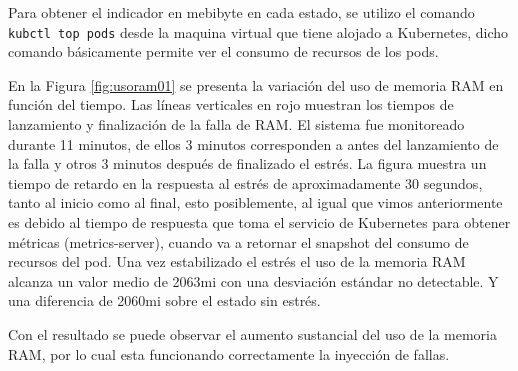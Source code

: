 \par Para obtener el indicador en mebibyte en cada estado, se utilizo el comando \\ \verb|kubctl top pods| desde la maquina virtual que tiene alojado a Kubernetes, dicho comando básicamente permite ver el consumo de recursos de los pods.\\

\par En la Figura \ref{fig:usoram01} se presenta la variación del uso de memoria RAM en función del tiempo. Las líneas verticales en rojo muestran los tiempos de lanzamiento y finalización de la falla de RAM. El sistema fue monitoreado durante 11 minutos, de ellos 3 minutos corresponden a antes del lanzamiento de la falla y otros 3 minutos después de finalizado el estrés. La figura muestra un tiempo de retardo en la respuesta al estrés de aproximadamente 30 segundos, tanto al inicio como al final, esto posiblemente, al igual que vimos anteriormente es debido al tiempo de respuesta que toma el servicio de Kubernetes para obtener métricas (metrics-server), cuando va a retornar el snapshot del consumo de recursos del pod. Una vez estabilizado el estrés el uso de la memoria RAM alcanza un valor medio de 2063mi con una desviación estándar no detectable. Y una diferencia de 2060mi sobre el estado sin estrés.\\


\vspace{\baselineskip}
\par Con el resultado se puede observar el aumento sustancial del uso de la memoria RAM, por lo cual esta funcionando correctamente la inyección de fallas.\\



